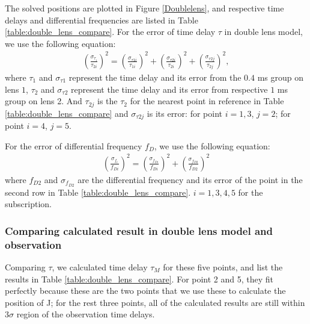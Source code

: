 \documentclass[useAMS,usenatbib]{mn2e}
\begin{document}
The solved positions are plotted in Figure \ref{Doublelens}, and respective time delays and differential frequencies are listed in Table \ref{table:double_lens_compare}. For the error of time delay $\tau$ in double lens model, we use the following equation: 
\begin{equation}
\begin{aligned}
(\frac{\sigma_{\tau_i}}{\tau_{2i}})^2 = (\frac{\sigma_{\tau1i}}{\tau_{1i}})^2+(\frac{\sigma_{\tau2i}}{\tau_{2i}})^2 + (\frac{\sigma_{\tau2j}}{\tau_{2j}})^2,
\end{aligned}
\end{equation}
where $\tau_1$ and $\sigma_{\tau1}$ represent the time delay and its error from the $0.4$ ms group on lens $1$, $\tau_2$ and $\sigma_{\tau2}$ represent the time delay and its error from respective $1$ ms group on lens 2. And $\tau_{2j}$ is the $\tau_2$ for the nearest point in reference in Table \ref{table:double_lens_compare} and $\sigma_{\tau2j}$ is its error: for point $i=1,3$, $j=2$; for point $i=4$, $j=5$.

For the error of differential frequency $f_D$, we use the following equation:
\begin{equation}
\begin{aligned}
(\frac{\sigma_{f_i}}{f_{Di}})^2=(\frac{\sigma_{f_{Di}}}{f_{Di}})^2+(\frac{\sigma_{f_{D2}}}{f_{D2}})^2
\end{aligned}
\end{equation}
where $f_{D2}$ and $\sigma_{f_{D2}}$ are the differential frequency and its error of the point in the second row in Table \ref{table:double_lens_compare}. $i=1,3,4,5$ for the subscription.

\subsubsection{Comparing calculated result in double lens model and observation}
Comparing $\tau$, we calculated time delay $\tau_M$ for these five points, and list the results in Table \ref{table:double_lens_compare}. For point 2 and 5, they fit perfectly because these are the two points that we use these to calculate the position of J; for the rest three points, all of the calculated results are still within $3\sigma$ region of the observation time delays.
\end{document}
